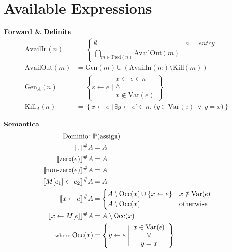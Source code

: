 \documentclass[a4paper,12pt,openany]{article}
\begin{document}
    \section*{Available Expressions}
    \textbf{Forward \& Definite}
    \begin{align*}
        \mbox{AvailIn}(n) &=
        \begin{cases}
            \emptyset & n = entry\\
            \bigcap\limits_{m\in \mbox{Pred}(n)} \mbox{AvailOut}(m)
        \end{cases}\\
        \mbox{AvailOut}(m) &= \mbox{Gen}(m) \cup (\mbox{AvailIn}(m) \setminus \mbox{Kill}(m))\\
        \mbox{Gen}_A(n) &= \left\{
            x \leftarrow e \;\Bigg\vert
            \begin{array}{cc}
                x \leftarrow e \in n\\
                \land\\
                x \notin \mbox{Var}(e)
            \end{array}
        \right\}\\
        \mbox{Kill}_A(n) &= \left\{
            x \leftarrow e \;\big\vert\, \exists y \leftarrow e' \in n.\; \big( y \in \mbox{Var}(e) \,\lor\, y=x \big)
        \right\}
    \end{align*}
    
    \textbf{Semantica}
    \begin{align*}
        \mbox{Dominio: }& \mathbb{P}(\mbox{assign})\\
        \llbracket ; \rrbracket^\#A &= A\\
        \llbracket \mbox{zero}(e) \rrbracket^\#A &= A\\
        \llbracket \mbox{non-zero}(e) \rrbracket^\#A &= A\\
        \llbracket M[e_1]\leftarrow e_2 \rrbracket^\#A &= A\\
        \llbracket x \leftarrow e \rrbracket^\#A &=
        \begin{cases}
            A \setminus \mbox{Occ}(x) \cup \{x\leftarrow e\} & x\notin \mbox{Var}(e)\\
            A \setminus \mbox{Occ}(x) & \mbox{otherwise}
        \end{cases}\\
        \llbracket x\leftarrow M[e] \rrbracket^\#A &= A\setminus \mbox{Occ}(x)\\
        \mbox{{\footnotesize where} Occ}(x) &=
        \left\{
            y\leftarrow e \;\Bigg\vert
            \begin{array}{cc}
                x \in \mbox{Var}(e)\\
                \lor\\
                y=x
            \end{array}
        \right\}
    \end{align*}
    
\end{document}
